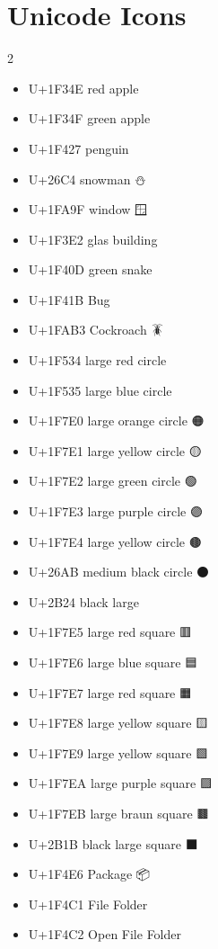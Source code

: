 \chapter{Unicode Icons}

\begin{multicols}{2}
\begin{itemize}
    \item U+1F34E red apple           🍎
    \item U+1F34F green apple         🍏
    \item U+1F427 penguin             🐧
    \item U+26C4  snowman             ⛄
    \item U+1FA9F window              🪟
    \item U+1F3E2 glas building       🏢
    \item U+1F40D green snake         🐍
    \item U+1F41B Bug                 🐛
    \item U+1FAB3 Cockroach           🪳
    \item U+1F534 large red circle    🔴
    \item U+1F535 large blue circle   🔵
    \item U+1F7E0 large orange circle 🟠
    \item U+1F7E1 large yellow circle 🟡
    \item U+1F7E2 large green circle  🟢
    \item U+1F7E3 large purple circle 🟣
    \item U+1F7E4 large yellow circle 🟤
    \item U+26AB  medium black circle ⚫
    \item U+2B24  black large         %
    \item U+1F7E5 large red square    🟥
    \item U+1F7E6 large blue square   🟦
    \item U+1F7E7 large red square    🟧
    \item U+1F7E8 large yellow square 🟨
    \item U+1F7E9 large yellow square 🟩
    \item U+1F7EA large purple square 🟪
    \item U+1F7EB large braun square  🟫
    \item U+2B1B  black large square  ⬛
    \item U+1F4E6 Package             📦
    \item U+1F4C1 File Folder         📁
    \item U+1F4C2 Open File Folder    📂

\end{itemize}
\end{multicols}
